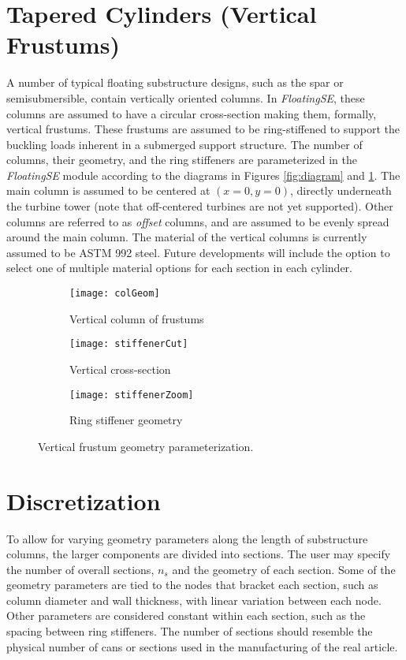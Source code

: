 \section{Tapered Cylinders (Vertical Frustums)}
A number of typical floating substructure designs, such as the spar or
semisubmersible, contain vertically oriented columns.  In
\textit{FloatingSE}, these columns are
assumed to have a circular cross-section making them, formally, vertical
frustums.  These frustums are assumed to be ring-stiffened to support
the buckling loads inherent in a submerged support structure.  The
number of columns, their geometry, and the ring stiffeners are
parameterized in the \textit{FloatingSE} module according to the
diagrams in Figures \ref{fig:diagram} and \ref{fig:column}.  The main
column is assumed to be centered at $(x=0, y=0)$, directly underneath the
turbine tower (note that off-centered turbines are not yet supported).
Other columns are referred to as \textit{offset} columns, and are
assumed to be evenly spread around the main column.  The material of the
vertical columns is currently assumed to be ASTM 992 steel.
Future developments will include the option to select one of multiple
material options for each section in each cylinder.

\begin{figure}[htb]
  \begin{subfigure}[b]{0.38\linewidth}
    \centering \texttt{[image: colGeom]}
    \caption{Vertical column of frustums}
  \end{subfigure}
  \begin{subfigure}[b]{0.29\linewidth}
    \centering \texttt{[image: stiffenerCut]}
    \caption{Vertical cross-section}
  \end{subfigure}
  \begin{subfigure}[b]{0.29\linewidth}
    \centering \texttt{[image: stiffenerZoom]}
    \caption{Ring stiffener geometry}
  \end{subfigure}
  \caption{Vertical frustum geometry parameterization.}
  \label{fig:column}
\end{figure}

\section{Discretization}
To allow for varying geometry parameters along the length of
substructure columns, the larger components are divided into sections.
The user may specify the number of overall sections, $n_s$ and the
geometry of each section.  Some of the geometry parameters are tied to
the nodes that bracket each section, such as column diameter and wall
thickness, with linear variation between each node.  Other parameters
are considered constant within each section, such as the spacing between
ring stiffeners.  The number of sections should resemble the physical
number of cans or sections used in the manufacturing of the real
article.

